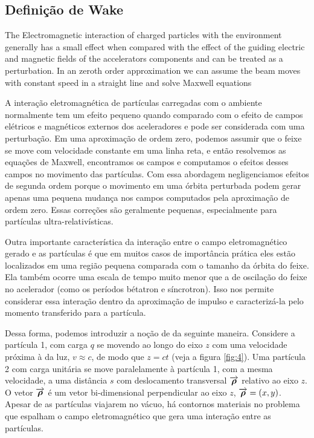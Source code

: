 \subsection{Definição de Wake}\label{ssec:wake_definition}

The Electromagnetic interaction of charged particles with the environment generally has a small effect when compared with the effect of the guiding electric and magnetic fields of the accelerators components and can be treated as a perturbation. In an zeroth order approximation we can assume the beam moves with constant speed in a straight line and solve Maxwell equations

A interação eletromagnética de partículas carregadas com o ambiente normalmente tem um efeito pequeno quando comparado com o efeito de campos elétricos e magnéticos externos dos aceleradores e pode ser considerada com uma perturbação. Em uma aproximação de ordem zero, podemos assumir que o feixe se move com velocidade constante em uma linha reta, e então resolvemos as equações de Maxwell, encontramos os campos e computamos o efeitos desses campos no movimento das partículas. Com essa abordagem negligenciamos efeitos de segunda ordem porque o movimento em uma órbita perturbada podem gerar apenas uma pequena mudança nos campos computados pela aproximação de ordem zero. Essas correções são geralmente pequenas, especialmente para partículas ultra-relativísticas.

Outra importante característica da interação entre o campo eletromagnético gerado e as partículas é que em muitos casos de importância prática eles estão localizados em uma região pequena comparada com o tamanho da órbita do feixe. Ela também ocorre uma escala de tempo muito menor que a de oscilação do feixe no acelerador (como os períodos bétatron e síncrotron). Isso nos permite considerar essa interação dentro da aproximação de impulso e caracterizá-la pelo momento transferido para a partícula.

Dessa forma, podemos introduzir a noção de  da seguinte maneira. Considere a partícula 1, com carga $q$ se movendo ao longo do eixo $z$ com uma velocidade próxima à da luz, $v\approx c$, de modo que $z=ct$ (veja a figura \ref{fig:4}). Uma partícula 2 com carga unitária se move paralelamente à partícula 1, com a mesma velocidade, a uma distância $s$ com deslocamento transversal $\overrightarrow{\boldsymbol{\rho}}$ relativo ao eixo $z$. O vetor $\overrightarrow{\boldsymbol{\rho}}$ é um vetor bi-dimensional perpendicular ao eixo $z$, $\overrightarrow{\boldsymbol{\rho}} = (x,y)$. Apesar de as partículas viajarem no vácuo, há contornos materiais no problema que espalham o campo eletromagnético que gera uma interação entre as partículas.

